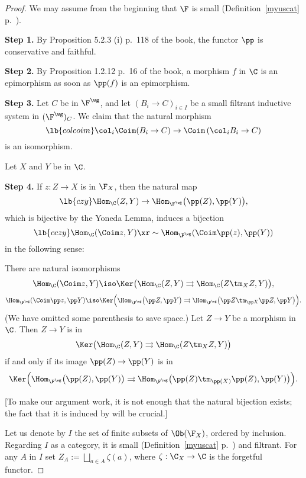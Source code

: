 \documentclass[12pt]{article}
\theoremstyle{remark}
\theoremstyle{definition}
\begin{document}
\begin{proof} %
We may assume from the beginning that $\F$ is small (Definition~\ref{myuscat} p.~).

\nn\textbf{Step 1.} By Proposition 5.2.3 (i) p.~118 of the book, the functor $\pp$ is conservative and faithful.

\nn\textbf{Step 2.} By Proposition 1.2.12 p.~16 of the book, a morphism $f$ in $\C$ is an epimorphism as soon as $\pp(f)$ is an epimorphism.

\nn\textbf{Step 3.} Let $C$ be in $\F^\wg$, and let $(B_i\to C)_{i\in I}$ be a small filtrant inductive system in $(\F^\wg)_C$. We claim that the natural morphism
\begin{equation}\lb{colcoim}
\col_i\Coim(B_i\to C)\to\Coim\left(\col_iB_i\to C\right)
\end{equation}
is an isomorphism.

Let $X$ and $Y$ be in $\C$.

\nn\textbf{Step 4.} If $z:Z\to X$ is in $\F_X$, then the natural map 
\begin{equation}\lb{czy}
\Hom_\C(Z,Y)\to\Hom_{\F^\wg}\big(\pp(Z),\pp(Y)\big),
\end{equation} 
which is bijective by the Yoneda Lemma, induces a bijection 
\begin{equation}\lb{cczy}
\Hom_\C(\Coim z,Y)\xr\sim\Hom_{\F^\wg}(\Coim\pp(z),\pp(Y))
\end{equation} 
in the following sense:

There are natural isomorphisms 
$$
\Hom_\C(\Coim z,Y)\iso\Ker\big(\Hom_\C(Z,Y)\rightrightarrows\Hom_\C(Z\tm_XZ,Y)\big),
$$
$$
\Hom_{\F^\wg}(\Coim\pp z,\pp Y)\iso\Ker\Big(\Hom_{\F^\wg}\big(\pp Z,\pp Y\big)\rightrightarrows\Hom_{\F^\wg}\big(\pp Z\tm_{\pp X}\pp Z,\pp Y\big)\Big).
$$ 
(We have omitted some parenthesis to save space.) Let $Z\to Y$ be a morphism in $\C$. Then $Z\to Y$ is in %
$$
\Ker\big(\Hom_\C(Z,Y)\rightrightarrows\Hom_\C(Z\tm_XZ,Y)\big)
$$ 
if and only if its image $\pp(Z)\to\pp(Y)$ is in 
$$
\Ker\Big(\Hom_{\F^\wg}\big(\pp(Z),\pp(Y)\big)\rightrightarrows\Hom_{\F^\wg}\big(\pp(Z)\tm_{\pp(X)}\pp(Z),\pp(Y)\big)\Big).
$$ 

[To make our argument work, it is not enough that the natural bijection  exists; the fact that it is induced by  will be crucial.] 

Let us denote by $I$ the set of finite subsets of $\Ob(\F_X)$, ordered by inclusion. Regarding $I$ as a category, it is small (Definition~\ref{myuscat} p.~) and filtrant. For any $A$ in $I$ set $Z_A:=\bigsqcup_{a\in A}\zeta(a)$, where $\zeta:\C_X\to\C$ is the forgetful functor.


\end{proof}
\end{document}
